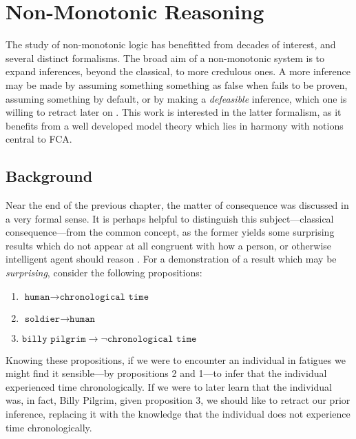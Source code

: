 \chapter{Non-Monotonic Reasoning}
\label{chapter:non-monotonic-reasoning}

The study of non-monotonic logic has benefitted from decades of interest, and several distinct formalisms. The broad aim of a non-monotonic system is to expand inferences, beyond the classical, to more credulous ones. A more  inference may be made by assuming something something as false when fails to be proven, assuming something by default, or by making a \textit{defeasible} inference, which one is willing to retract later on \cite{shohamSemanticApproach}. This work is interested in the latter formalism, as it benefits from a well developed model theory which lies in harmony with notions central to FCA.

\section{Background}
\label{section:nmr-background}
Near the end of the previous chapter, the matter of consequence was discussed in a very formal sense. It is perhaps helpful to distinguish this subject---classical consequence---from the common concept, as the former yields some surprising results which do not appear at all congruent with how a person, or otherwise intelligent agent should reason \cite{tarski1936consequence, kraus1990nonmonotonic}. For a demonstration of a result which may be \textit{surprising}, consider the following propositions:
\begin{enumerate}
     \item $\texttt{human} \rightarrow \texttt{chronological time}$
     \item $\texttt{soldier} \rightarrow \texttt{human}$
     \item $\texttt{billy pilgrim} \rightarrow \neg \texttt{chronological time}$
\end{enumerate}

Knowing these propositions, if we were to encounter an individual in fatigues we might find it sensible---by propositions 2 and 1---to infer that the individual experienced time chronologically. If we were to later learn that the individual was, in fact, Billy Pilgrim, given proposition 3, we should like to retract our prior inference, replacing it with the knowledge that the individual does not experience time chronologically.

